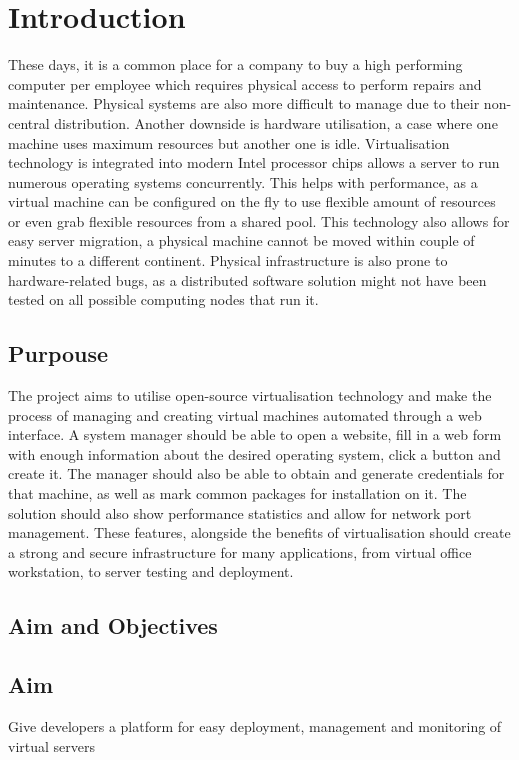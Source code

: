 \documentclass{article}
\begin{document}
  \section{Introduction}
  These days, it is a common place for a company to buy a high performing computer per employee which requires physical access to perform repairs and maintenance. Physical systems are also more difficult to manage due to their non-central distribution. Another downside is hardware utilisation, a case where one machine uses maximum resources but another one is idle. Virtualisation technology is integrated into modern Intel processor chips allows a server to run numerous operating systems concurrently. This helps with performance, as a virtual machine can be configured on the fly to use flexible amount of resources or even grab flexible resources from a shared pool. This technology also allows for easy server migration, a physical machine cannot be moved within couple of minutes to a different continent. Physical infrastructure is also prone to hardware-related bugs, as a distributed software solution might not have been tested on all possible computing nodes that run it.
  
  \subsection{Purpouse}
   The project aims to utilise open-source virtualisation technology and make the process of managing and creating virtual machines automated through a web interface. A system manager should be able to open a website, fill in a web form with enough information about the desired operating system, click a button and create it. The manager should also be able to obtain and generate credentials for that machine, as well as mark common packages for installation on it. The solution should also show performance statistics and allow for network port management. These features, alongside the benefits of virtualisation should create a strong and secure infrastructure for many applications, from virtual office workstation, to server testing and deployment.
  \subsection{Aim and Objectives}
	  \subsection{Aim}
	  Give developers a platform for easy deployment, management and monitoring of virtual servers
\end{document}

